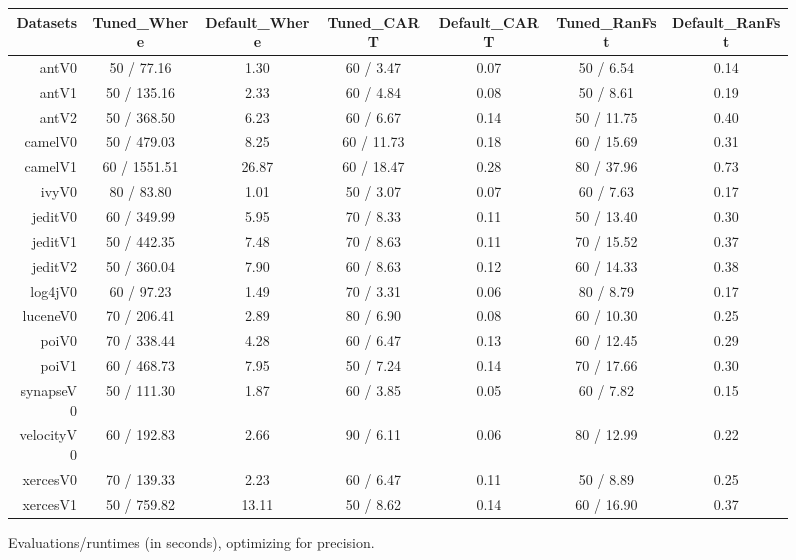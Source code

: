 \documentclass{sig-alternative}
\def\baselinestretch{1}
\begin{document}
\begin{figure}[!ht]

\renewcommand{\baselinestretch}{0.8}
\scriptsize
\centering
  \begin{tabular}{r|c |c |c |c |c |c }
    \hline\hline
    Datasets & Tuned\_Where & Default\_Where & Tuned\_CART & Default\_CART & Tuned\_RanFst & Default\_RanFst\\
    \hline
    antV0 & 50 /  77.16 & 1.30 & 60 /  3.47 & 0.07 & 50 /  6.54 & 0.14\\
    antV1 & 50 /  135.16 & 2.33 & 60 /  4.84 & 0.08 & 50 /  8.61 & 0.19\\
    antV2 & 50 /  368.50 & 6.23 & 60 /  6.67 & 0.14 & 50 /  11.75 & 0.40\\
    camelV0 & 50 /  479.03 & 8.25 & 60 /  11.73 & 0.18 & 60 /  15.69 & 0.31\\
    camelV1 & 60 /  1551.51 & 26.87 & 60 /  18.47 & 0.28 & 80 /  37.96 & 0.73\\
    ivyV0 & 80 /  83.80 & 1.01 & 50 /  3.07 & 0.07 & 60 /  7.63 & 0.17\\
    jeditV0 & 60 /  349.99 & 5.95 & 70 /  8.33 & 0.11 & 50 /  13.40 & 0.30\\
    jeditV1 & 50 /  442.35 & 7.48 & 70 /  8.63 & 0.11 & 70 /  15.52 & 0.37\\
    jeditV2 & 50 /  360.04 & 7.90 & 60 /  8.63 & 0.12 & 60 /  14.33 & 0.38\\
    log4jV0 & 60 /  97.23 & 1.49 & 70 /  3.31 & 0.06 & 80 /  8.79 & 0.17\\
    luceneV0 & 70 /  206.41 & 2.89 & 80 /  6.90 & 0.08 & 60 /  10.30 & 0.25\\
    poiV0 & 70 /  338.44 & 4.28 & 60 /  6.47 & 0.13 & 60 /  12.45 & 0.29\\
    poiV1 & 60 /  468.73 & 7.95 & 50 /  7.24 & 0.14 & 70 /  17.66 & 0.30\\
    synapseV0 & 50 /  111.30 & 1.87 & 60 /  3.85 & 0.05 & 60 /  7.82 & 0.15\\
    velocityV0 & 60 /  192.83 & 2.66 & 90 /  6.11 & 0.06 & 80 /  12.99 & 0.22\\
    xercesV0 & 70 /  139.33 & 2.23 & 60 /  6.47 & 0.11 & 50 /  8.89 & 0.25\\
    xercesV1 & 50 /  759.82 & 13.11 & 50 /  8.62 & 0.14 & 60 /  16.90 & 0.37\\
  \end{tabular}
  \caption{Evaluations/runtimes  (in seconds), optimizing for  precision.  }\label{fig:etimes}
\end{figure}
\end{document}
